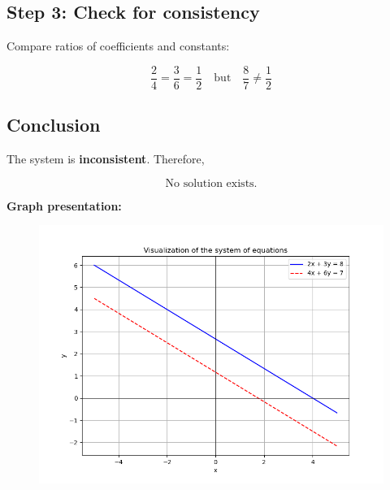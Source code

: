 \documentclass[journal]{IEEEtran}
\begin{document}
\subsection*{Step 3: Check for consistency}

Compare ratios of coefficients and constants:

\begin{equation}
\frac{2}{4} = \frac{3}{6} = \frac{1}{2} 
\quad \text{but} \quad 
\frac{8}{7} \neq \frac{1}{2}
\end{equation}

\subsection*{Conclusion}

The system is \textbf{inconsistent}. Therefore, 

\begin{equation}
\text{No solution exists.}
\end{equation}


\textbf{Graph presentation:}
\begin{figure}[H]
\begin{center}
\includegraphics[width=0.6\columnwidth]{figs/fig10.png}
\end{center}
\caption{}
\label{fig:Fig}
\end{figure}    
\end{document}
